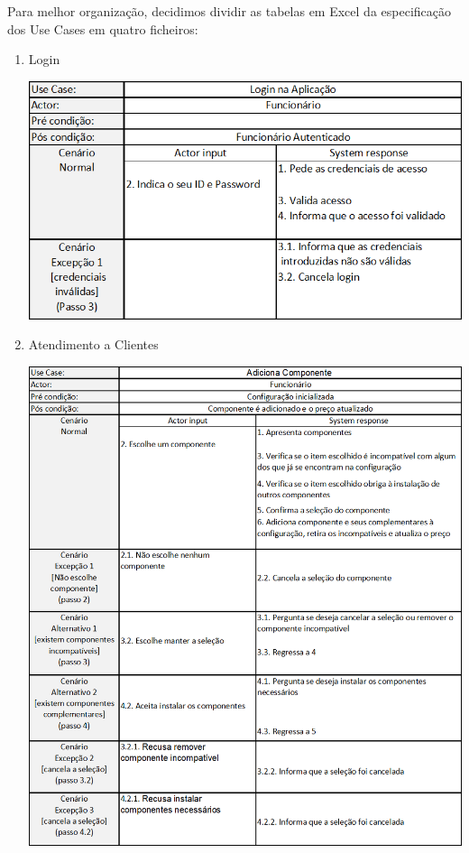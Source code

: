 \documentclass[11pt]{article} %
\begin{document}
Para melhor organização, decidimos dividir as tabelas em Excel da especificação dos Use Cases em quatro ficheiros: 
\begin{enumerate}
	\item Login

 		\includegraphics[width = 5in]{login.png} \newpage
	\item  Atendimento a Clientes
	\begin{center}
 		\includegraphics[width = 5in]{ac_adicionacomp.png} 

\end{center}
\end{enumerate}
\end{document}
